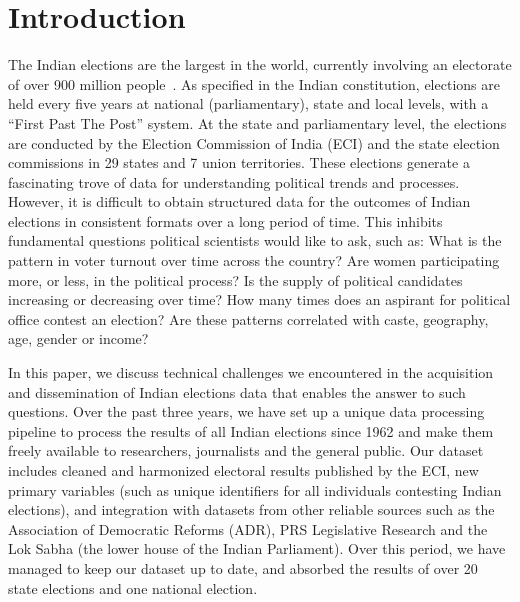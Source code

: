
\section{Introduction}

The Indian elections are the largest in the world, currently involving an electorate of over 900 million people~\cite{quraishi2014undocumented}.  As specified in the Indian constitution, elections are held every five years at national (parliamentary), state and local levels, with a ``First Past The Post'' system. At the state and parliamentary level, the elections are conducted by the Election Commission of India (ECI) and the state election commissions in 29 states and 7 union territories. These elections generate a fascinating trove of data for understanding political trends and processes. However, it is difficult to obtain structured data for the outcomes of Indian elections in consistent formats over a long period of time. This inhibits fundamental questions political scientists would like to ask, such as: What is the pattern in voter turnout over time across the country? Are women participating more, or less, in the political process? Is the supply of political candidates increasing or decreasing over time? How many times does an aspirant for political office contest an election? Are these patterns correlated with caste, geography, age, gender or income?

In this paper, we discuss technical challenges we encountered in the acquisition and dissemination of Indian elections data that enables the answer to such questions. Over the past three years, we have set up a unique data processing pipeline to process the results of all Indian elections since 1962 and make them freely available to researchers, journalists and the general public. Our dataset includes cleaned and harmonized electoral results published by the ECI, new primary variables (such as unique identifiers for all individuals contesting Indian elections), and integration with datasets from other reliable sources such as the Association of Democratic Reforms (ADR), PRS Legislative Research and the Lok Sabha (the lower house of the Indian Parliament). Over this period, we have managed to keep our dataset up to date, and absorbed the results of over 20 state elections and one national election.

